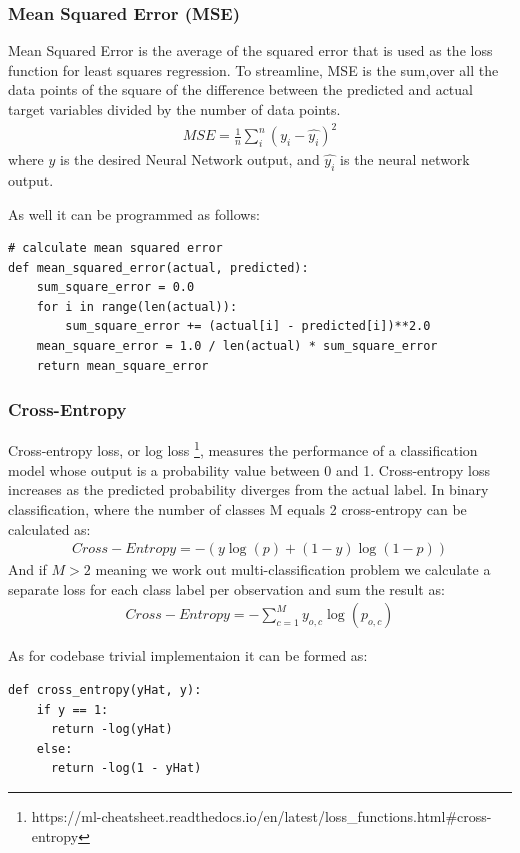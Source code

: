 \documentclass{article}
\begin{document}
\subsubsection{Mean Squared Error (MSE)}
Mean Squared Error is the average of the squared error that is used as the loss function for least squares regression. To streamline, MSE is the sum,over all the data points of the square of the difference between the predicted and actual target variables divided by the number of data points.
\begin{align*}
MSE = \frac{{1}}{n} \sum_{i}^{n} (y_i - \widehat{y_i})^2
\end{align*}
where $y$ is the desired Neural Network output, and $\widehat{y_i}$ is the neural network output.

As well it can be programmed as follows:
\begin{lstlisting}
# calculate mean squared error
def mean_squared_error(actual, predicted):
	sum_square_error = 0.0
	for i in range(len(actual)):
		sum_square_error += (actual[i] - predicted[i])**2.0
	mean_square_error = 1.0 / len(actual) * sum_square_error
	return mean_square_error
\end{lstlisting}

\subsubsection{Cross-Entropy}
Cross-entropy loss, or log loss \footnote{https://ml-cheatsheet.readthedocs.io/en/latest/loss_functions.html#cross-entropy}, measures the performance of a classification model whose output is a probability value between 0 and 1. Cross-entropy loss increases as the predicted probability diverges from the actual label.
In binary classification, where the number of classes M equals 2 cross-entropy can be calculated as:
\begin{align*}
Cross-Entropy = -{(y\log(p) + (1 - y)\log(1 - p))}
\end{align*}
And if $M > 2$ meaning we work out multi-classification problem we calculate a separate loss for each class label per observation and sum the result as:
\begin{align*}
Cross-Entropy = -\sum_{c=1}^My_{o,c}\log(p_{o,c})
\end{align*}

As for codebase trivial implementaion it can be formed as:  
\begin{lstlisting}
def cross_entropy(yHat, y):
    if y == 1:
      return -log(yHat)
    else:
      return -log(1 - yHat)
\end{lstlisting}
\end{document}
